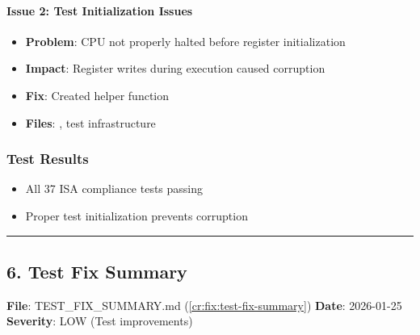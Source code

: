 \paragraph{Issue 2: Test Initialization Issues}\label{cr:fix:fixes-index:issue-2-test-initialization-issues}

\begin{record}

\begin{itemize}
\tightlist
\item
  \textbf{Problem}: CPU not properly halted before register
  initialization
\item
  \textbf{Impact}: Register writes during execution caused corruption
\item
  \textbf{Fix}: Created  helper function
\item
  \textbf{Files}: , test infrastructure
\end{itemize}

\end{record}

\subsubsection{Test Results}\label{cr:fix:fixes-index:test-results-1}

\begin{record}

\begin{itemize}
\tightlist
\item
  \ok{} All 37 ISA compliance tests passing
\item
  \ok{} Proper test initialization prevents corruption
\end{itemize}

\begin{center}\rule{0.5\linewidth}{0.5pt}\end{center}

\end{record}

\subsection{6. Test Fix Summary}\label{cr:fix:fixes-index:6-test-fix-summary}

\begin{record}

\textbf{File}:
TEST\_\allowbreak{}FIX\_\allowbreak{}SUMMARY.md (\cref{cr:fix:test-fix-summary})
\textbf{Date}: 2026-01-25 \textbf{Severity}: \ok{} LOW (Test
improvements)

\end{record}

